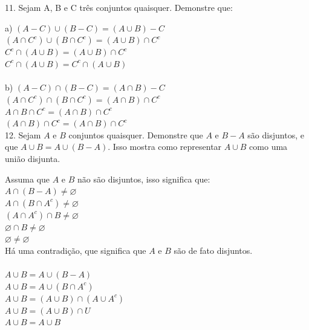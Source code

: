 \documentclass[12pt]{article}
\begin{document}
  	11. Sejam A, B e C três conjuntos quaisquer. Demonstre que:
  	\vspace{12pt}
  	
  	\noindent a) $(A-C)\cup(B-C) = (A\cup B)-C$\\
  	$(A\cap C^{c})\cup(B\cap C^{c}) = (A\cup B)\cap C^{c}$\\
  	$C^{c}\cap(A\cup B) = (A\cup B)\cap C^{c}$\\
  	$C^{c}\cap(A\cup B) = C^{c}\cap(A\cup B)$\\\\
  	
  	\noindent b) $(A-C)\cap(B-C) = (A\cap B)-C$\\
  	$ (A \cap C^{c}) \cap (B \cap C^{c}) = (A \cap B) \cap C^{c} $\\
  	$ A \cap B \cap C^{c} = (A \cap B) \cap C^{c} $\\
  	$ (A \cap B) \cap C^{c} = (A \cap B) \cap C^{c} $\\
  	
  	12. Sejam $A$ e $B$ conjuntos quaisquer. Demonstre que $A$ e $B-A$ são disjuntos, e que $A\cup B = A\cup (B-A)$. Isso mostra como representar $A\cup B$ como uma união disjunta.
    \vspace{12pt}
  	
  	\noindent  Assuma que $A$ e $B$ não são disjuntos, isso significa que:\\
  	$ A \cap (B-A) \neq \varnothing $\\
  	$ A \cap (B \cap A^{c}) \neq \varnothing $\\
  	$ (A \cap A^{c}) \cap B \neq \varnothing $\\
  	$ \varnothing \cap B \neq \varnothing $\\
  	$ \varnothing \neq \varnothing $ \\
  	Há uma contradição, que significa que $A$ e $B$ são de fato disjuntos.\\\\
  	
  	\noindent $A\cup B = A\cup(B-A)$\\
  	$A\cup B = A\cup(B\cap A^{c})$\\
  	$A\cup B = (A\cup B)\cap(A\cup A^{c})$\\
  	$A\cup B = (A\cup B)\cap U$\\
  	$A\cup B = A\cup B$\\
  	
\end{document}
